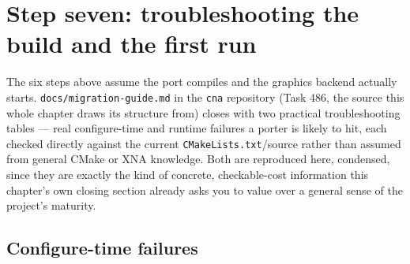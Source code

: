\section{Step seven: troubleshooting the build and the first run}

The six steps above assume the port compiles and the graphics backend actually starts.
\texttt{docs/migration-guide.md} in the \texttt{cna} repository (Task 486, the source this
whole chapter draws its structure from) closes with two practical troubleshooting tables ---
real configure-time and runtime failures a porter is likely to hit, each checked directly
against the current \texttt{CMakeLists.txt}/source rather than assumed from general CMake or
XNA knowledge. Both are reproduced here, condensed, since they are exactly the kind of
concrete, checkable-cost information this chapter's own closing section already asks you to
value over a general sense of the project's maturity.

\subsection{Configure-time failures}

